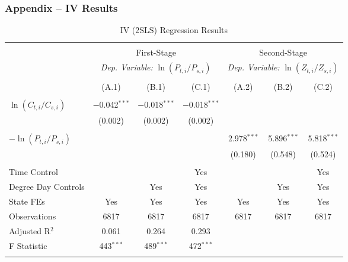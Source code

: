 \documentclass[aspectratio=169]{beamer}
\begin{document}
\begin{frame}
\frametitle{Appendix -- IV Results}

\begin{table}[h] \centering 
	\caption{IV (2SLS) Regression Results}
	\label{table:2} 
	\scriptsize
	\begin{tabular}{@{\extracolsep{4pt}}lcccccc} 
		\\[-6ex]\hline  
		\hline \\[-1.6ex] 
		& \multicolumn{3}{c}{First-Stage} & \multicolumn{3}{c}{Second-Stage} \\ [0.5ex]
		& \multicolumn{3}{c}{\textit{Dep. Variable:} $\ln (P_{t,i} / P_{s,i})$ } & \multicolumn{3}{c}{\textit{Dep. Variable:}  $\ln (Z_{ t, i} / Z_{ s, i})$}\\ [0.5ex]
		\cmidrule(lr){2-4} \cmidrule(lr){5-7}\\[-2.9ex] 
		& (A.1) & (B.1) & (C.1) & (A.2) & (B.2) & (C.2)\\ [0.5ex]
		\hline \\[-1.8ex] 
		$ \ln (C_{t,i} / C_{s,i})$ & $-$0.042$^{***}$ & $-$0.018$^{***}$ & $-$0.018$^{***}$ &  &  &  \\ 
		& (0.002) & (0.002) & (0.002) &  &  &  \\ 
		& & & & & & \\[-1ex]
		$-\ln (P_{t,i} / P_{s,i})$ &  &  &  & 2.978$^{***}$ & 5.896$^{***}$ & 5.818$^{***}$ \\ 
		&  &  &  & (0.180) & (0.548) & (0.524) \\   [0.9ex]
		\hline \\[-1.8ex] 
		Time Control &   &   & Yes &   &   & Yes  \\ 
		Degree Day Controls &   & Yes  & Yes &   & Yes  & Yes \\ 
		State FEs &  Yes & Yes  & Yes  & Yes & Yes & Yes \\ 
		Observations & 6817 & 6817 & 6817 & 6817 & 6817 & 6817 \\ 
		Adjusted R$^{2}$ & 0.061 & 0.264 & 0.293 & &  &  \\ 
		F Statistic & 443$^{***}$  & 489$^{***}$ & 472$^{***}$  &  &  &  \\ 
		\hline 
		\hline \\[-1.8ex] 
	\end{tabular} 
\end{table}



\end{frame}
\end{document}
